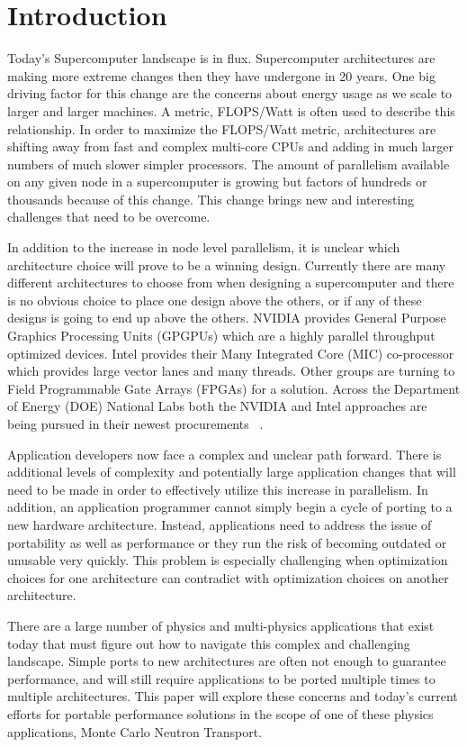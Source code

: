 \section{Introduction}

Today's Supercomputer landscape is in flux.
%
Supercomputer architectures are making more extreme changes then they have undergone in 20 years.
%
One big driving factor for this change are the concerns about energy usage as we scale to larger and larger machines.
%
A metric, FLOPS/Watt is often used to describe this relationship.
%
In order to maximize the FLOPS/Watt metric, architectures are shifting away from fast and complex multi-core CPUs and adding in much larger numbers of much slower simpler processors.
%
The amount of parallelism available on any given node in a supercomputer is growing but factors of hundreds or thousands because of this change.
%
This change brings new and interesting challenges that need to be overcome.
%

%
In addition to the increase in node level parallelism, it is unclear which architecture choice will prove to be a winning design.
%
Currently there are many different architectures to choose from when designing a supercomputer and there is no obvious choice to place one design above the others, or if any of these designs is going to end up above the others.
%
NVIDIA provides General Purpose Graphics Processing Units (GPGPUs) which are a highly parallel throughput optimized devices.
%
Intel provides their Many Integrated Core (MIC) co-processor which provides large vector lanes and many threads.
%
Other groups are turning to Field Programmable Gate Arrays (FPGAs) for a solution.
%
Across the Department of Energy (DOE) National Labs both the NVIDIA and Intel approaches are being pursued in their newest procurements ~\cite{coralWeb, trinityWeb}.
%

Application developers now face a complex and unclear path forward.
%
There is additional levels of complexity and potentially large application changes that will need to be made in order to effectively utilize this increase in parallelism.
%
In addition, an application programmer cannot simply begin a cycle of porting to a new hardware architecture.
%
Instead, applications need to address the issue of portability as well as performance or they run the risk of becoming outdated or unusable very quickly.
%
This problem is especially challenging when optimization choices for one architecture can contradict with optimization choices on another architecture.
%

%
There are a large number of physics and multi-physics applications that exist today that must figure out how to navigate this complex and challenging landscape.
%
Simple ports to new architectures are often not enough to guarantee performance, and will still require applications to be ported multiple times to multiple architectures.
%
This paper will explore these concerns and today's current efforts for portable performance solutions in the scope of one of these physics applications, Monte Carlo Neutron Transport.
%

